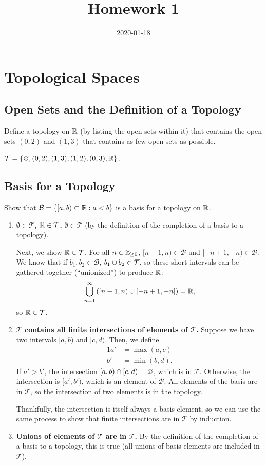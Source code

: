 \documentclass[twocolumn, noxcolor, maketitle]{rbt-mathnotes-hw}
\title{Homework 1}
\date{2020-01-18}
\def\T{\mathcal{T}}
\def\basis{\mathcal{B}}
\begin{document}
\maketitle

\section{Topological Spaces}
\subsection{Open Sets and the Definition of a Topology}
\begin{problem}[1.7]
  Define a topology on $\mathbb{R}$ (by listing the open sets within it) that contains
  the open sets $(0,2)$ and $(1,3)$ that contains as few open sets as possible.
\end{problem}
$\T = \{ \emptyset, (0,2), (1,3), (1,2), (0,3), \R \}$.

\subsection{Basis for a Topology}
\begin{problem}[1.10]
  Show that $\mathcal{B} = \{[a,b) \subset \mathbb{R} : a < b\}$ is a basis for a
  topology on $\mathbb{R}$.
\end{problem}
\begin{enumerate}
  \item \textbf{$\emptyset \in \T$, $\R \in \T$.} $\emptyset \in \T$ (by the
    definition of the completion of a basis to a topology).

    Next, we show $\R \in \T$. For all $n \in \mathbb{Z}_{\ge 0}$, $[n-1, n) \in \basis$
    and $[-n + 1, -n) \in \basis$. We know that if $b_1, b_2 \in \basis$, $b_1
    \union b_2 \in \T$, so these short intervals can be gathered together (``unionized'')
    to produce $\mathbb{R}$:
    \[ \bigcup_{n=1}^{\infty} \left( [n-1, n) \cup [-n + 1, -n] \right) = \mathbb{R}, \]
    so $\R \in \T$.

  \item \textbf{$\T$ contains all finite intersections of elements of $\T$.}
    Suppose we have two intervals $[a, b)$ and $[c, d)$. Then, we define
    \begin{alignat*}{1}
      a' &= \max(a, c) \\
      b' &= \min(b, d).
    \end{alignat*}
    If $a' > b'$, the intersection $[a, b) \cap [c, d) = \varnothing$, which is
    in $\T$. Otherwise, the intersection is $[a', b')$, which is an element of
    $\basis$. All elements of the basis are in $\T$, so the intersection of two
    elements is in the topology.

    Thankfully, the intersection is itself always a basis element, so we can
    use the same process to show that finite intersections are in $\T$ by
    induction.

  \item \textbf{Unions of elements of $\T$ are in $\T$.} By the definition of
    the completion of a basis to a topology, this is true (all unions of basis
    elements are included in $\T$).
\end{enumerate}
\end{document}
